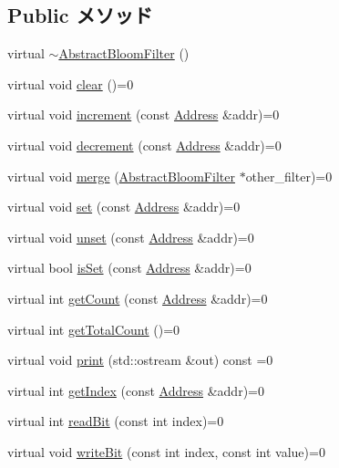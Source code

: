\subsection*{Public メソッド}
\begin{DoxyCompactItemize}
\item 
virtual \hyperlink{classAbstractBloomFilter_a750758d99727e6a06111be87c6b62cfa}{$\sim$AbstractBloomFilter} ()
\item 
virtual void \hyperlink{classAbstractBloomFilter_a5eeb94d22b8366d1b68d0614384802fe}{clear} ()=0
\item 
virtual void \hyperlink{classAbstractBloomFilter_af795f7fdeff0174e914ed1d792ffe4ff}{increment} (const \hyperlink{classAddress}{Address} \&addr)=0
\item 
virtual void \hyperlink{classAbstractBloomFilter_aa387151f4ab03c6cd497d4385e34c21a}{decrement} (const \hyperlink{classAddress}{Address} \&addr)=0
\item 
virtual void \hyperlink{classAbstractBloomFilter_accf3024e7bc583662b4dee2e25ae484a}{merge} (\hyperlink{classAbstractBloomFilter}{AbstractBloomFilter} $\ast$other\_\-filter)=0
\item 
virtual void \hyperlink{classAbstractBloomFilter_a54e1262ae5f60efeb8714d0556b3c32e}{set} (const \hyperlink{classAddress}{Address} \&addr)=0
\item 
virtual void \hyperlink{classAbstractBloomFilter_a0a35d1c7bad19fe9362068a0d319ec5f}{unset} (const \hyperlink{classAddress}{Address} \&addr)=0
\item 
virtual bool \hyperlink{classAbstractBloomFilter_aa1b69d102655f8c5879b3df95eb205dc}{isSet} (const \hyperlink{classAddress}{Address} \&addr)=0
\item 
virtual int \hyperlink{classAbstractBloomFilter_ab6253919ea6ff1b2c17506742b34147d}{getCount} (const \hyperlink{classAddress}{Address} \&addr)=0
\item 
virtual int \hyperlink{classAbstractBloomFilter_a25ea5e1ef3d4911226f37649b6efed22}{getTotalCount} ()=0
\item 
virtual void \hyperlink{classAbstractBloomFilter_a3ea5f7af5db62cc24f4e40df9ea5c971}{print} (std::ostream \&out) const =0
\item 
virtual int \hyperlink{classAbstractBloomFilter_a4dd174ae24a8237d41cf0b02c78b896d}{getIndex} (const \hyperlink{classAddress}{Address} \&addr)=0
\item 
virtual int \hyperlink{classAbstractBloomFilter_a6c0e9a098f0f210aa42eb2f1553804eb}{readBit} (const int index)=0
\item 
virtual void \hyperlink{classAbstractBloomFilter_a961813caf7bb3aece26914ac43c6293f}{writeBit} (const int index, const int value)=0
\end{DoxyCompactItemize}


